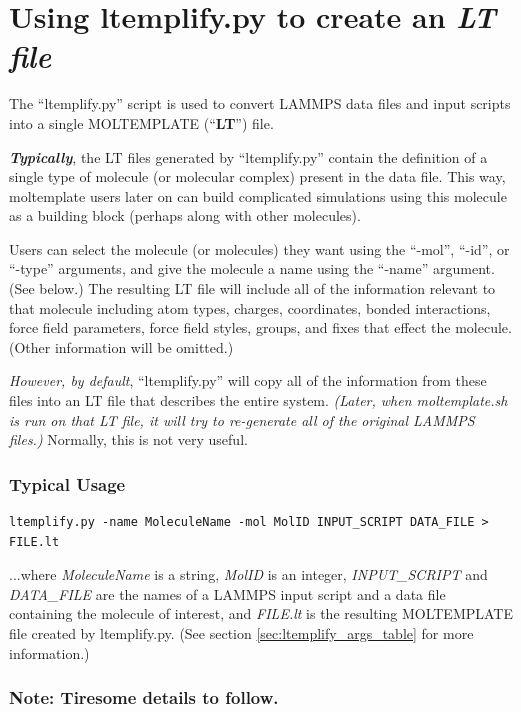 \documentclass[11pt]{article}
\begin{document}
\section{Using ltemplify.py to create an \textit{LT file}}
\label{sec:ltemplify}

The ``ltemplify.py'' script is used to convert LAMMPS data files and
input scripts into a single MOLTEMPLATE (``\textbf{LT}'') file.

\textbf{\textit{Typically}}, the LT files generated
by ``ltemplify.py'' contain the definition of a single type of molecule
(or molecular complex) present in the data file.
This way, moltemplate users later on can build complicated simulations using
this molecule as a building block (perhaps along with other molecules).

Users can select the molecule (or molecules) they want
using the ``-mol'', ``-id'', or ``-type'' arguments,
and give the molecule a name using the ``-name'' argument.  (See below.)
The resulting LT file will include all of the information relevant
to that molecule including atom types, charges, coordinates,
bonded interactions, force field parameters, force field styles,
groups, and fixes that effect the molecule.
(Other information will be omitted.)

\textit{However, by default}, ``ltemplify.py'' will copy all of the information
from these files into an LT file that
describes the entire system.
\textit{(Later, when moltemplate.sh is run on that LT file,
  it will try to re-generate all of the original LAMMPS files.)}
Normally, this is not very useful.


\subsubsection*{Typical Usage}
\begin{verbatim}
ltemplify.py -name MoleculeName -mol MolID INPUT_SCRIPT DATA_FILE > FILE.lt
\end{verbatim}
...where \textit{MoleculeName} is a string,
\textit{MolID} is an integer,
\textit{INPUT\_SCRIPT} and \textit{DATA\_FILE}
are the names of a LAMMPS input script and a data file
containing the molecule of interest,
and \textit{FILE.lt} is the resulting
MOLTEMPLATE file created by ltemplify.py.
(See section \ref{sec:ltemplify_args_table} for more information.)

\subsubsection*{Note: Tiresome details to follow.}
\end{document}
